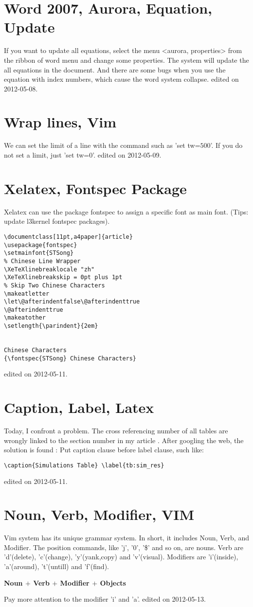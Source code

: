 \section{Word 2007, Aurora, Equation, Update}
If you want to update all equations, select the menu <aurora, properties> from the ribbon of word menu and change some properties. The system will update the all equations in the document. And there are some bugs when you use the equation with index numbers, which cause the word system collapse.
\hfill {\tiny  edited on 2012-05-08.}
%
\section{Wrap lines, Vim}
We can set the limit of a line with the command such as 'set tw=$500$'. If you do not set a limit, just 'set tw=$0$'.
\hfill {\tiny  edited on 2012-05-09.}
%
\section{Xelatex, Fontspec Package}
Xelatex can use the package fontspec to assign a specific font as main font. (Tips: update l3kernel fontspec packages).
\begin{verbatim}
\documentclass[11pt,a4paper]{article}
\usepackage{fontspec}
\setmainfont{STSong}
% Chinese Line Wrapper
\XeTeXlinebreaklocale "zh"
\XeTeXlinebreakskip = 0pt plus 1pt
% Skip Two Chinese Characters
\makeatletter
\let\@afterindentfalse\@afterindenttrue
\@afterindenttrue
\makeatother
\setlength{\parindent}{2em}


Chinese Characters
{\fontspec{STSong} Chinese Characters}

\end{verbatim}
\hfill {\tiny  edited on 2012-05-11.}
%
\section{Caption, Label, Latex}
Today, I confront a problem. The cross referencing number of all tables are wrongly linked to the section number in my article . After googling the web, the solution is found :
Put caption clause before label clause, such like:
\begin{verbatim}
\caption{Simulations Table} \label{tb:sim_res}
\end{verbatim}
\hfill {\tiny  edited on 2012-05-11.}
%
\section{Noun, Verb, Modifier, VIM}
Vim system has its unique grammar system. In short, it includes Noun, Verb, and Modifier. The position commands, like 'j', '0', '\$' and so on, are nouns. Verb are 'd'(delete), 'c'(change), 'y'(yank,copy) and 'v'(visual). Modifiers are 'i'(inside), 'a'(around), 't'(untill) and 'f'(find). 
\begin{center}
\bf Noun $+$ Verb $+$ Modifier $+$ Objects
\end{center}
Pay more attention to the modifier 'i' and 'a'.
\hfill {\tiny  edited on 2012-05-13.}
%
